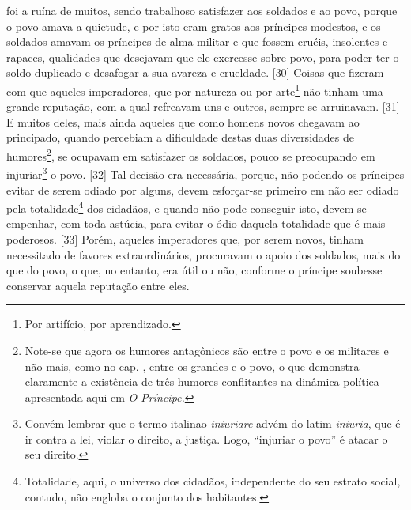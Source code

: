 foi a ruína de muitos, sendo trabalhoso satisfazer aos soldados e ao
povo, porque o povo amava a quietude, e por isto eram gratos aos
príncipes modestos, e os soldados amavam os príncipes de alma militar e
que fossem cruéis, insolentes e rapaces, qualidades que desejavam que
ele exercesse sobre povo, para poder ter o soldo duplicado e desafogar a
sua avareza e crueldade. {[}30{]} Coisas que fizeram com que aqueles
imperadores, que por natureza ou por arte\footnote{Por artifício, por
  aprendizado.} não tinham uma grande reputação, com a qual refreavam
uns e outros, sempre se arruinavam. {[}31{]} E muitos deles, mais ainda
aqueles que como homens novos chegavam ao principado, quando percebiam a
dificuldade destas duas diversidades de humores\footnote{Note-se que
  agora os humores antagônicos são entre o povo e os militares e não
  mais, como no cap. , entre os grandes e o povo, o que demonstra
  claramente a existência de três humores conflitantes na dinâmica
  política apresentada aqui em \emph{O Príncipe.}}, se ocupavam em
satisfazer os soldados, pouco se preocupando em injuriar\footnote{Convém
  lembrar que o termo italinao \emph{iniuriare} advém do latim
  \emph{iniuria}, que é ir contra a lei, violar o direito, a justiça.
  Logo, ``injuriar o povo'' é atacar o seu direito.} o povo. {[}32{]}
Tal decisão era necessária, porque, não podendo os príncipes evitar de
serem odiado por alguns, devem esforçar-se primeiro em não ser odiado
pela totalidade\footnote{Totalidade, aqui, o universo dos cidadãos,
  independente do seu estrato social, contudo, não engloba o conjunto
  dos habitantes.} dos cidadãos, e quando não pode conseguir isto,
devem-se empenhar, com toda astúcia, para evitar o ódio daquela
totalidade que é mais poderosos. {[}33{]} Porém, aqueles imperadores
que, por serem novos, tinham necessitado de favores extraordinários,
procuravam o apoio dos soldados, mais do que do povo, o que, no entanto,
era útil ou não, conforme o príncipe soubesse conservar aquela reputação
entre eles.

